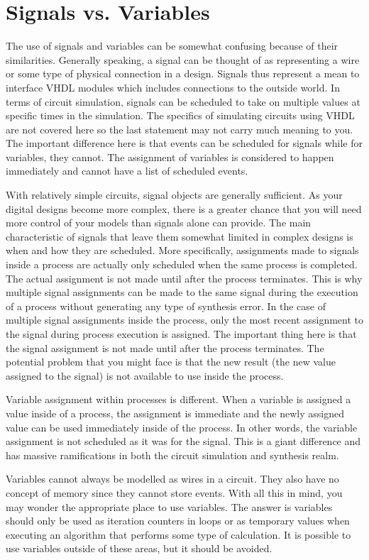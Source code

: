 \section{Signals vs. Variables}
The use of signals and variables can be somewhat confusing because of their similarities. Generally speaking, a signal can be thought of as representing a wire or some type of physical connection in a design. Signals thus represent a mean to interface VHDL modules which includes connections to the outside world. In terms of circuit simulation, signals can be scheduled to take on multiple values at specific times in the simulation. The specifics of simulating circuits using VHDL are not covered here so the last statement may not carry much meaning to you. The important difference here is that events can be scheduled for signals while for variables, they cannot. The assignment of variables is considered to happen immediately and cannot have a list of scheduled events.

With relatively simple circuits, signal objects are generally sufficient. As your digital designs become more complex, there is a greater chance that you will need more control of your models than signals alone can provide. The main characteristic of signals that leave them somewhat limited in complex designs is when and how they are scheduled. More specifically, assignments made to signals inside a process are actually only scheduled when the same process is completed. The actual assignment is not made until after the process terminates. This is why multiple signal assignments can be made to the same signal during the execution of a process without generating any type of synthesis error. In the case of multiple signal assignments inside the process, only the most recent assignment to the signal during process execution is assigned. The important thing here is that the signal assignment is not made until after the process terminates. The potential problem that you might face is that the new result (the new value assigned to the signal) is not available to use inside the process. 

Variable assignment within processes is different. When a variable is assigned a value inside of a process, the assignment is immediate and the newly assigned value can be used immediately inside of the process. In other words, the variable assignment is not scheduled as it was for the signal. This is a giant difference and has massive ramifications in both the circuit simulation and synthesis realm. 

Variables cannot always be modelled as wires in a circuit. They also have no concept of memory since they cannot store events. With all this in mind, you may wonder the appropriate place to use variables. The answer is variables should only be used as iteration counters in loops or as temporary values when executing an algorithm that performs some type of calculation. It is possible to use variables outside of these areas, but it should be avoided.

